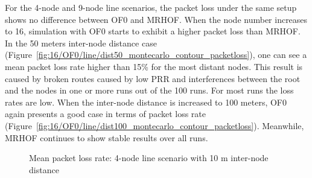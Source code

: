 For the 4-node and 9-node line scenarios, the packet loss under the same setup shows no difference between OF0 and MRHOF. When the node number increases to 16, simulation with OF0 starts to exhibit a higher packet loss than MRHOF. In the 50 meters inter-node distance case (Figure~\ref{fig:16/OF0/line/dist50_montecarlo_contour_packetloss}), one can see a mean packet loss rate higher than 15\% for the most distant nodes. This result is caused by broken routes caused by low PRR and interferences between the root and the nodes in one or more runs out of the 100 runs. For most runs the loss rates are low. When the inter-node distance is increased to 100 meters, OF0 again presents a good case in terms of packet loss rate (Figure~\ref{fig:16/OF0/line/dist100_montecarlo_contour_packetloss}). Meanwhile, MRHOF continues to show stable results over all runs.
\begin{figure}[p]
  \centering
    \leavevmode
   \caption{Mean packet loss rate: 4-node line scenario with 10 m inter-node distance}
   \label{fig:pl_4_line_10}
   \vspace{-20pt}
\end{figure}

